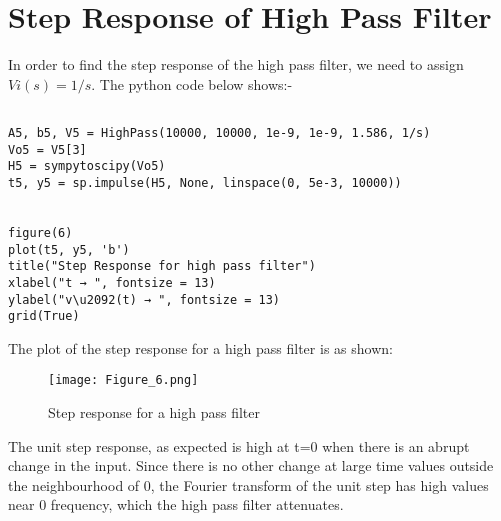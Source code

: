 \documentclass[11pt, a4paper]{article}
\begin{document}

\section*{Step Response of High Pass Filter}
In order to find the step response of the high pass filter, we need to assign $ Vi(s) = 1/s $. 
The python code below shows:-
\begin{verbatim}
    
A5, b5, V5 = HighPass(10000, 10000, 1e-9, 1e-9, 1.586, 1/s)
Vo5 = V5[3]
H5 = sympytoscipy(Vo5)
t5, y5 = sp.impulse(H5, None, linspace(0, 5e-3, 10000))


figure(6)
plot(t5, y5, 'b')
title("Step Response for high pass filter")
xlabel("t → ", fontsize = 13)
ylabel("v\u2092(t) → ", fontsize = 13)
grid(True) 
\end{verbatim}
The plot of the step response for a high pass filter is as shown:
\begin{figure}[!tbh]
   	\centering
   	\texttt{[image: Figure\_6.png]}
   	\label{fig:32}
   	\caption{Step response for a high pass filter}
   \end{figure}\newpage
The unit step response, as expected is high at t=0 when there is an abrupt
change in the input. Since there is no other change at large time values outside
the neighbourhood of 0, the Fourier transform of the unit step has high values
near 0 frequency, which the high pass filter attenuates.
\end{document}
